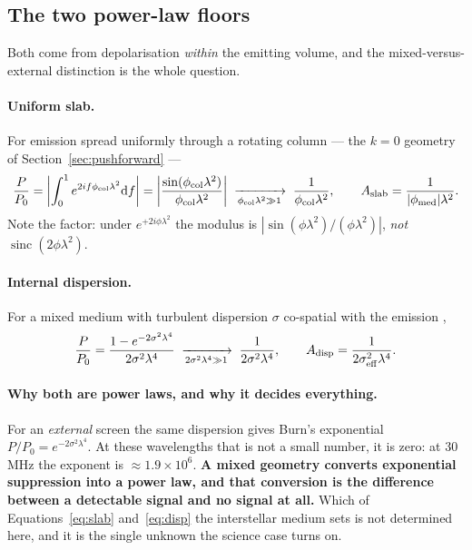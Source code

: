 \documentclass[11pt]{article}
\newcommand{\lamsq}{\ensuremath{\lambda^{2}}}
\begin{document}
\subsection{The two power-law floors}

Both come from depolarisation \emph{within} the emitting volume, and
the mixed-versus-external distinction is the whole question.

\paragraph{Uniform slab.} For emission spread uniformly through a
rotating column --- the $k=0$ geometry of
Section~\ref{sec:pushforward} ---
\begin{equation}
  \frac{P}{P_0} = \left|\int_0^1 e^{2if\phi_{\rm col}\lamsq}\mathrm df\right|
  = \left|\frac{\sin(\phi_{\rm col}\lamsq)}{\phi_{\rm col}\lamsq}\right|
  \;\xrightarrow[\phi_{\rm col}\lamsq \gg 1]{}\;
  \frac{1}{\phi_{\rm col}\lamsq},
  \qquad
  A_{\rm slab} = \frac{1}{|\phi_{\rm med}|\lamsq}.
  \label{eq:slab}
\end{equation}
Note the factor: under $e^{+2i\phi\lamsq}$ the modulus is
$|\sin(\phi\lamsq)/(\phi\lamsq)|$, \emph{not}
$\operatorname{sinc}(2\phi\lamsq)$.

\paragraph{Internal dispersion.} For a mixed medium with turbulent
dispersion $\sigma$ co-spatial with the emission
\citep{burn1966,sokoloff1998},
\begin{equation}
  \frac{P}{P_0} = \frac{1-e^{-2\sigma^{2}\lambda^{4}}}{2\sigma^{2}\lambda^{4}}
  \;\xrightarrow[2\sigma^2\lambda^4 \gg 1]{}\;
  \frac{1}{2\sigma^{2}\lambda^{4}},
  \qquad
  A_{\rm disp} = \frac{1}{2\sigma_{\rm eff}^{2}\lambda^{4}}.
  \label{eq:disp}
\end{equation}

\paragraph{Why both are power laws, and why it decides everything.}
For an \emph{external} screen the same dispersion gives Burn's
exponential $P/P_0 = e^{-2\sigma^2\lambda^4}$. At these wavelengths
that is not a small number, it is zero: at 30\,MHz the exponent is
$\approx1.9\times10^{6}$. \textbf{A mixed geometry converts exponential
suppression into a power law, and that conversion is the difference
between a detectable signal and no signal at all.} Which of
Equations~\eqref{eq:slab} and~\eqref{eq:disp} the interstellar medium
sets is not determined here, and it is the single unknown the science
case turns on.
\end{document}
